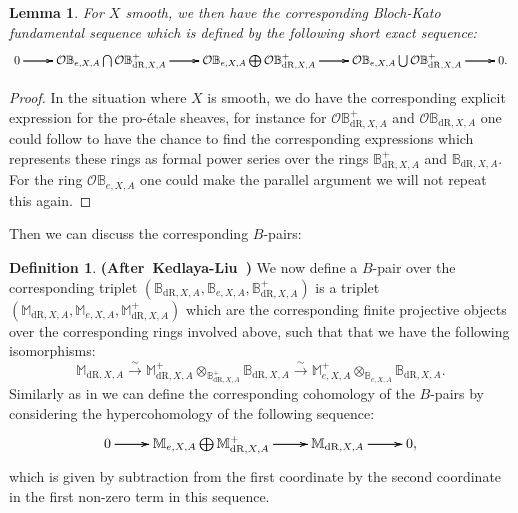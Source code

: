 \documentclass[12pt]{amsart}
\newtheorem{lemma}[theorem]{Lemma}
\theoremstyle{definition}
\newtheorem{definition}[theorem]{Definition}
\numberwithin{equation}{section}
\begin{document}
\begin{lemma}  
For $X$ smooth, we then have the corresponding Bloch-Kato fundamental sequence which is defined by the following short exact sequence:
\[
\xymatrix@R+0pc@C+0pc{
0\ar[r] \ar[r] \ar[r] &\mathcal{O}\mathbb{B}_{e,X,A}\bigcap \mathcal{O}\mathbb{B}^+_{\mathrm{dR},X,A}    \ar[r] \ar[r] \ar[r]  &\mathcal{O}\mathbb{B}_{e,X,A}\bigoplus \mathcal{O}\mathbb{B}^+_{\mathrm{dR},X,A} \ar[r] \ar[r] \ar[r] &\mathcal{O}\mathbb{B}_{e,X,A}\bigcup \mathcal{O}\mathbb{B}^+_{\mathrm{dR},X,A} \ar[r] \ar[r] \ar[r] &0 .
}
\]
\end{lemma}


\begin{proof}
In the situation where $X$ is smooth, we do have the corresponding explicit expression for the pro-\'etale sheaves, for instance for $\mathcal{O}\mathbb{B}^+_{\mathrm{dR},X,A}$ and $\mathcal{O}\mathbb{B}_{\mathrm{dR},X,A}$ one could follow \cite[Proposition 6.10]{Sch1} to have the chance to find the corresponding expressions which represents these rings as formal power series over the rings $\mathbb{B}^+_{\mathrm{dR},X,A}$ and $\mathbb{B}_{\mathrm{dR},X,A}$. For the ring $\mathcal{O}\mathbb{B}_{e,X,A}$	one could make the parallel argument we will not repeat this again.
\end{proof}




\indent Then we can discuss the corresponding $B$-pairs:

\begin{definition} \mbox{\bf{(After Kedlaya-Liu \cite[Definition 9.3.11]{KL15})}}
	We now define a $B$-pair over the corresponding triplet $(\mathbb{B}_{\mathrm{dR},X,A}, \mathbb{B}_{e,X,A}, \mathbb{B}^+_{\mathrm{dR},X,A})$ is a triplet  $(\mathbb{M}_{\mathrm{dR},X,A}, \mathbb{M}_{e,X,A}, \mathbb{M}^+_{\mathrm{dR},X,A})$ which are the corresponding finite projective objects over the corresponding rings involved above, such that that we have the following isomorphisms:
\begin{displaymath}
\mathbb{M}_{\mathrm{dR},X,A}\overset{\sim}{\longrightarrow}\mathbb{M}_{\mathrm{dR},X,A}^+\otimes_{\mathbb{B}^+_{\mathrm{dR},X,A}}\mathbb{B}_{\mathrm{dR},X,A}\overset{\sim}{\longrightarrow}\mathbb{M}_{e,X,A}^+\otimes_{\mathbb{B}_{e,X,A}} \mathbb{B}_{\mathrm{dR},X,A}.
\end{displaymath}
Similarly as in \cite[Definition 9.4.4]{KL15} we can define the corresponding cohomology of the $B$-pairs by considering the hypercohomology of the following sequence:
\[
\xymatrix@R+0pc@C+0pc{
0\ar[r] \ar[r] \ar[r] &\mathbb{M}_{e,X,A}\bigoplus \mathbb{M}^+_{\mathrm{dR},X,A}    \ar[r] \ar[r] \ar[r]  &\mathbb{M}_{\mathrm{dR},X,A} \ar[r] \ar[r] \ar[r] &0,
}
\]
which is given by subtraction from the first coordinate by the second coordinate in the first non-zero term in this sequence.

\end{definition}
\end{document}
